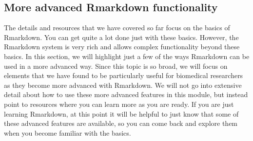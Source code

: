 \documentclass[]{tufte-book}
\begin{document}
\hypertarget{more-advanced-rmarkdown-functionality}{%
\subsection{More advanced Rmarkdown functionality}\label{more-advanced-rmarkdown-functionality}}

The details and resources that we have covered so far focus on the basics of
Rmarkdown. You can get quite a lot done just with these basics. However,
the Rmarkdown system is very rich and allows complex functionality beyond
these basics. In this section, we will highlight just a few of the ways
Rmarkdown can be used in a more advanced way. Since this topic is so broad, we
will focus on elements that we have found to be particularly useful for
biomedical researchers as they become more advanced with Rmarkdown. We will not
go into extensive detail about how to use these more advanced features in this
module, but instead point to resources where you can learn more as you are
ready. If you are just learning Rmarkdown, at this point it will be helpful to
just know that some of these advanced features are available, so you can come
back and explore them when you become familiar with the basics.
\end{document}
